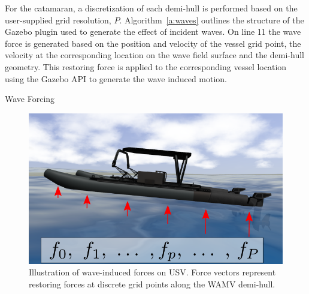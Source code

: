 \documentclass[utf8]{frontiersSCNS} %
\begin{document}
For the \wamv{} catamaran, a discretization of each demi-hull is performed based on the user-supplied grid resolution, $P$.  Algorithm~\ref{a:waves} outlines the structure of the Gazebo plugin used to generate the effect of incident waves.  On line 11 the wave force is generated based on the position and velocity of the vessel grid point, the velocity at the corresponding location on the wave field surface and the demi-hull geometry.  This restoring force is applied to the corresponding vessel location using the Gazebo API to generate the wave induced motion.
\begin{algorithm}[H]
  \caption{Wave Forcing}
  \label{a:waves}
\end{algorithm}
\begin{figure}[H]
  \centering
  \includegraphics[width=\FigWidth\textwidth]{images/wamv_grid_v2.png}
  \caption{Illustration of wave-induced forces on USV. Force vectors represent restoring forces at discrete grid points along the WAMV demi-hull.}
  \label{f:wamv_grids}
\end{figure}
\end{document}
